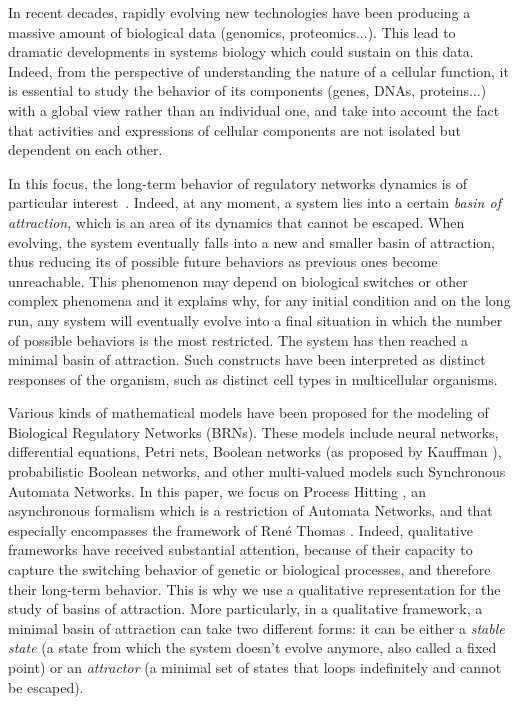 

In recent decades, rapidly evolving new technologies have been producing a massive amount of biological data (genomics, proteomics...). This lead to dramatic developments in systems biology which could sustain on this data. Indeed, from the perspective of understanding the nature of a cellular function, it is essential to study the behavior of its components (genes, DNAs, proteins...) with a global view rather than an individual one, and take into account the fact that activities and expressions of cellular components are not isolated but dependent on each other.

In this focus, the long-term behavior of regulatory networks dynamics is of particular interest~\cite{wuensche1998genomic}.
Indeed, at any moment, a system lies into a certain \emph{basin of attraction}, which is an area of its dynamics that cannot be escaped.
When evolving, the system eventually falls into a new and smaller basin of attraction, thus reducing its of possible future behaviors as previous ones become unreachable.
This phenomenon may depend on biological switches or other complex phenomena
and it explains why, for any initial condition and on the long run, any system will eventually evolve into a final situation in which the number of possible behaviors is the most restricted. 
The system has then reached a minimal basin of attraction.
Such constructs have been interpreted as distinct responses of the organism, such as distinct cell types in multicellular organisms. 

Various kinds of mathematical models have been proposed for the modeling of Biological Regulatory Networks (BRNs). These models include neural networks, differential equations, Petri nets, Boolean networks (as proposed by Kauffman \cite{stuart1993origins}), probabilistic Boolean networks, and other multi-valued models such Synchronous Automata Networks. In this paper, we focus on Process Hitting , an asynchronous formalism which is a restriction of Automata Networks, and that especially encompasses the framework of René Thomas . Indeed, qualitative frameworks have received substantial attention, because of their capacity to capture the switching behavior of genetic or biological processes, and therefore their long-term behavior. This is why we use a qualitative representation for the study of basins of attraction.
More particularly, in a qualitative framework, a minimal basin of attraction can take two different forms: it can be either a \emph{stable state} (a state from which the system doesn't evolve anymore, also called a fixed point) or an \emph{attractor} (a minimal set of states that loops indefinitely and cannot be escaped).


